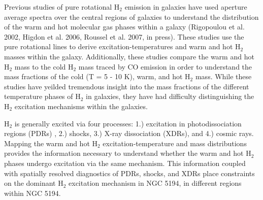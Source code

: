 \documentclass[manuscript]{aastex}
\begin{document}
Previous studies of pure rotational $\mathrm{H_2}$ emission in galaxies have used aperture average spectra over the central regions of galaxies to understand the distribution of the warm and hot molecular gas phases within a galaxy (Rigopoulou et al. 2002, Higdon et al. 2006, Roussel et al. 2007, in press).  These studies use the pure rotational lines to derive excitation-temperatures and warm and hot $\mathrm{H_2}$ masses within the galaxy.  Additionally, these studies compare the warm and hot $\mathrm{H_2}$ mass to the cold $\mathrm{H_2}$ mass traced by CO emission in order to understand the mass fractions of the cold (T = 5 - 10 K), warm, and hot $\mathrm{H_2}$ mass.  While these studies have yeilded tremendous insight into the mass fractions of the different temperature phases of $\mathrm{H_2}$ in galaxies, they have had difficulty distinguishing the $\mathrm{H_2}$ excitation mechanisms within the galaxies.

$\mathrm{H_2}$ is generally excited via four processes: 1.) excitation in photodissociation regions (PDRs) , 2.) shocks, 3.) X-ray dissociation (XDRs), and 4.) cosmic rays.  Mapping the warm and hot $\mathrm{H_2}$ excitation-temperature and mass distributions provides the information necessary to understand whether the warm and hot $\mathrm{H_2}$ phases undergo excitation via the same mechanism.  This information coupled with spatially resolved diagnostics of PDRs, shocks, and XDRs place constraints on the dominant $\mathrm{H_2}$ excitation mechanism in NGC 5194, in different regions within NGC 5194. 
\end{document}
